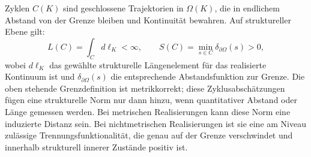 Zyklen \(C(K)\) sind geschlossene Trajektorien in \(\Omega(K)\), die in
endlichem Abstand von der Grenze bleiben und Kontinuität bewahren.
Auf struktureller Ebene gilt:
\[
    L(C) = \int_C d\ell_K < \infty,\qquad
    S(C) = \min_{s \in C} \delta_{\partial\Omega}(s) > 0,
\]
wobei \(d\ell_K\) das gewählte strukturelle Längenelement für das realisierte
Kontinuum ist und \(\delta_{\partial\Omega}(s)\) die entsprechende
Abstandsfunktion zur Grenze.
Die oben stehende Grenzdefinition ist metrikkorrekt; diese Zyklusabschätzungen
fügen eine strukturelle Norm nur dann hinzu, wenn quantitativer Abstand oder
Länge gemessen werden.
Bei metrischen Realisierungen kann diese Norm eine induzierte Distanz sein.
Bei nichtmetrischen Realisierungen ist sie eine am Niveau zulässige
Trennungsfunktionalität, die genau auf der Grenze verschwindet und innerhalb
strukturell innerer Zustände positiv ist.

